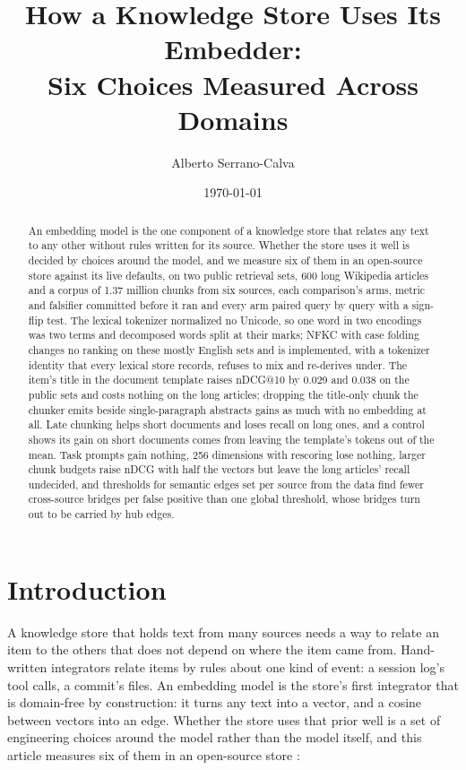 \documentclass[11pt]{article}
\title{How a Knowledge Store Uses Its Embedder:\\Six Choices Measured Across Domains}
\author{Alberto Serrano-Calva}
\date{\today}
\theoremstyle{plain}
\theoremstyle{definition}
\theoremstyle{remark}
\begin{document}
\maketitle

\begin{abstract}
An embedding model is the one component of a knowledge store that relates any text to any other
without rules written for its source. Whether the store uses it well is decided by choices around
the model, and we measure six of them in an open-source store against its live defaults, on two
public retrieval sets, 600 long Wikipedia articles and a corpus of 1.37 million chunks from six
sources, each comparison's arms, metric and falsifier committed before it ran and every arm paired
query by query with a sign-flip test. The lexical tokenizer normalized no Unicode, so one word in
two encodings was two terms and decomposed words split at their marks; NFKC with case folding
changes no ranking on these mostly English sets and is implemented, with a tokenizer identity that
every lexical store records, refuses to mix and re-derives under. The item's title in the document
template raises nDCG@10 by 0.029 and 0.038 on the public sets and costs nothing on the long
articles; dropping the title-only chunk the chunker emits beside single-paragraph abstracts gains
as much with no embedding at all. Late chunking helps short documents and loses recall on long
ones, and a control shows its gain on short documents comes from leaving the template's tokens out
of the mean. Task prompts gain nothing, 256 dimensions with rescoring lose nothing, larger chunk
budgets raise nDCG with half the vectors but leave the long articles' recall undecided, and
thresholds for semantic edges set per source from the data find fewer cross-source bridges per
false positive than one global threshold, whose bridges turn out to be carried by hub edges.
\end{abstract}

\section{Introduction}

A knowledge store that holds text from many sources needs a way to relate an item to the others
that does not depend on where the item came from. Hand-written integrators relate items by rules
about one kind of event: a session log's tool calls, a commit's files. An embedding model
\citep{vera2025embeddinggemma} is the store's first integrator that is domain-free by
construction: it turns any text into a vector, and a cosine between vectors into an edge. Whether
the store uses that prior well is a set of engineering choices around the model rather than the
model itself, and this article measures six of them in an open-source store
\citep{serranocalva2026palace}:
\end{document}
